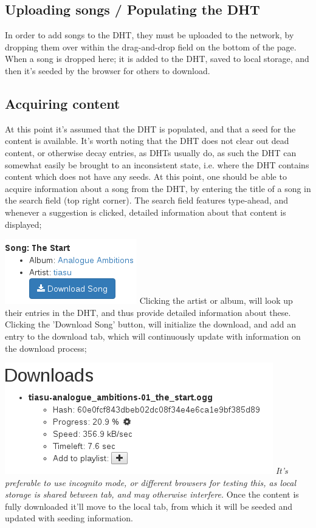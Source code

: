 \subsection{Uploading songs / Populating the \acs{DHT}}
In order to add songs to the \acs{DHT}, they must be uploaded to the network, by 
dropping them over within the drag-and-drop field on the bottom of the page.
When a song is dropped here; it is added to the \acs{DHT}, saved to local storage,
and then it's seeded by the browser for others to download.

\subsection{Acquiring content}
At this point it's assumed that the \acs{DHT} is populated, and that a seed for the
content is available. It's worth noting that the \acs{DHT} does not clear out dead
content, or otherwise decay entries, as \acs{DHT}s usually do, as such the \acs{DHT} can 
somewhat easily be brought to an inconsistent state, i.e. where the \acs{DHT}
contains content which does not have any seeds.
\newline\newline
At this point, one should be able to acquire information about a song from the
\acs{DHT}, by entering the title of a song in the search field (top right corner).
The search field features type-ahead, and whenever a suggestion is clicked,
detailed information about that content is displayed;

\includegraphics{gfx/search-info}
\newline
Clicking the artist or album, will look up their entries in the \acs{DHT}, and thus
provide detailed information about these. Clicking the 'Download Song' button,
will initialize the download, and add an entry to the download tab, which will
continuously update with information on the download process;

\includegraphics{gfx/download-info}
\newline
{\em It's preferable to use incognito mode, or different browsers for testing this,
as local storage is shared between tab, and may otherwise interfere.}
\newline\newline
Once the content is fully downloaded it'll move to the local tab, from which it
will be seeded and updated with seeding information. 

